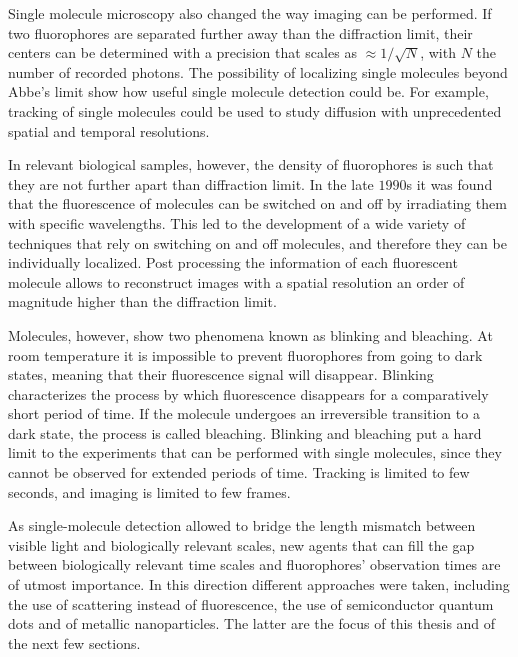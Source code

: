Single molecule microscopy also changed the way imaging can be performed. If two
fluorophores are separated further away than the diffraction limit, their
centers can be determined with a precision that scales as $\approx 1/\sqrt{N}$,
with $N$ the number of recorded photons. The possibility of localizing single
molecules beyond Abbe's limit show how useful single molecule detection could
be. For example, tracking of single molecules\cite{Schmidt1996} could be used to
study diffusion with unprecedented spatial and temporal resolutions.

In relevant biological samples, however, the density of fluorophores is such
that they are not further apart than diffraction limit. In the late $1990$s it
was found that the fluorescence of molecules can be switched on and off by
irradiating them with specific wavelengths\cite{Moerner1997}. This led to the
development of a wide variety of techniques that rely on switching on and off
molecules\cite{Betzig2006}, and therefore they can be individually
localized\cite{Dertinger2009}. Post processing the information of each
fluorescent molecule allows to reconstruct images with a spatial resolution an
order of magnitude higher than the diffraction limit\cite{Moerner2007}.

Molecules, however, show two phenomena known as blinking\cite{Orrit2010} and
bleaching\cite{Zondervan2004}. At room temperature it is impossible to prevent
fluorophores from going to dark states, meaning that their fluorescence signal
will disappear. Blinking characterizes the process by which fluorescence
disappears for a comparatively short period of time. If the molecule undergoes
an irreversible transition to a dark state, the process is called bleaching.
Blinking and bleaching put a hard limit to the experiments that can be performed
with single molecules, since they cannot be observed for extended periods of
time. Tracking is limited to few seconds, and imaging is limited to few frames.

As single-molecule detection allowed to bridge the length mismatch between
visible light and biologically relevant scales, new agents that can fill the gap
between biologically relevant time scales and fluorophores' observation times
are of utmost importance. In this direction different approaches were taken,
including the use of scattering instead of
fluorescence\cite{ortega2012interferometric}, the use of semiconductor quantum
dots\cite{alivisatos2005quantum} and of metallic
nanoparticles\cite{huang2009gold}. The latter are the focus of this thesis and
of the next few sections.

